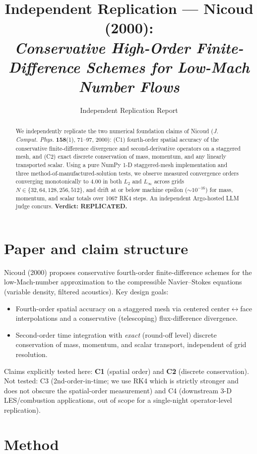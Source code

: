 \documentclass[11pt]{article}
\title{Independent Replication --- Nicoud (2000):\\
\emph{Conservative High-Order Finite-Difference Schemes for Low-Mach Number Flows}}
\author{Independent Replication Report}
\date{}
\begin{document}
\maketitle

\begin{abstract}
We independently replicate the two numerical foundation claims of Nicoud
(\emph{J. Comput. Phys.} \textbf{158}(1), 71--97, 2000):
(C1) fourth-order spatial accuracy of the conservative finite-difference
divergence and second-derivative operators on a staggered mesh, and
(C2) exact discrete conservation of mass, momentum, and any linearly
transported scalar. Using a pure NumPy 1-D staggered-mesh implementation and
three method-of-manufactured-solution tests, we observe measured convergence
orders converging monotonically to \(4.00\) in both \(L_2\) and \(L_\infty\)
across grids \(N\in\{32,64,128,256,512\}\), and drift at or below machine
epsilon (\(\sim 10^{-16}\)) for mass, momentum, and scalar totals over 1067
RK4 steps. An independent Argo-hosted LLM judge concurs. \textbf{Verdict:
REPLICATED.}
\end{abstract}

\section{Paper and claim structure}
Nicoud (2000) proposes conservative fourth-order finite-difference schemes
for the low-Mach-number approximation to the compressible Navier--Stokes
equations (variable density, filtered acoustics). Key design goals:
\begin{itemize}
  \item Fourth-order spatial accuracy on a staggered mesh via centered
        center$\leftrightarrow$face interpolations and a conservative
        (telescoping) flux-difference divergence.
  \item Second-order time integration with \emph{exact} (round-off level)
        discrete conservation of mass, momentum, and scalar transport,
        independent of grid resolution.
\end{itemize}
Claims explicitly tested here: \textbf{C1} (spatial order) and \textbf{C2}
(discrete conservation). Not tested: C3 (2nd-order-in-time; we use RK4 which
is strictly stronger and does not obscure the spatial-order measurement) and
C4 (downstream 3-D LES/combustion applications, out of scope for a
single-night operator-level replication).

\section{Method}
\end{document}
